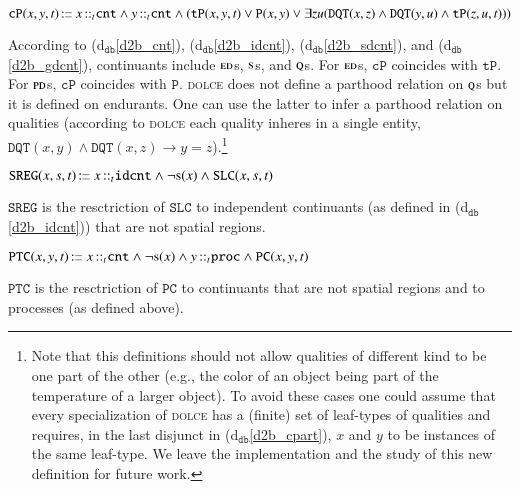 \documentclass[ao]{iosart2x}
\newcommand{\dbDefLabel}{\textrm{d$_\texttt{db}$}}
\newcounter{cntdbdf}
\newcommand{\dbdf}[1]{\refstepcounter{cntdbdf}\begin{small}{\bf \dbDefLabel\thecntdbdf\label{#1}}\end{small}}
\newcommand{\refdbdf}[1]{({\dbDefLabel}\ref{#1})}
\newcommand{\pr}[1]{\mathtt{#1}}
\newcommand{\cn}[1]{\mathtt{#1}}
\newcommand\textequal{%
 \rule[.08ex]{5pt}{0.35pt}\llap{\rule[.78ex]{5pt}{0.35pt}}}
\newcommand{\sdef}{{\hspace{1.5pt}:\hspace{-2.5pt}\textequal\hspace{3pt}}}
\newcommand{\dolce}{{\textsc{dolce}}}
\newcommand{\bfo}{{\textsc{bfo}}}
\newcommand {\EDdcat} {\textsc{ed}}
\newcommand {\PDdcat} {\textsc{pd}}
\newcommand {\Qdcat} {\textsc{q}}
\newcommand {\Sdcat} {\textsc{s}}
\newcommand {\TPd} {\ensuremath{\pr{tP}}}
\newcommand {\Pd} {\ensuremath{\pr{P}}}
\newcommand {\DQTd} {\ensuremath{\pr{DQT}}}
\newcommand {\PCd} {\ensuremath{\pr{PC}}}
\newcommand {\SLCd} {\ensuremath{\pr{SLC}}}
\newcommand{\cntbcat}{\cn{cnt}}
\newcommand{\idcntbcat}{\cn{idcnt}}
\newcommand{\procbcat}{\cn{proc}}
\newcommand{\bfocpart}{\pr{cP}}
\newcommand{\bfoiof}[1]{{\,::_{#1\:\!}}}
\newcommand{\bfosregof}{\pr{SREG}}
\newcommand{\bfoparticin}{\pr{PTC}}
\begin{document}
\item[\dbdf{d2b_cpart}] $\bfocpart(x,y,t) \sdef x \bfoiof{t} \cntbcat \land y \bfoiof{t} \cntbcat \land (\TPd(x,y,t) \lor \Pd(x,y) \lor \exists zu(\DQTd(x,z) \land \DQTd(y,u) \land \TPd(z,u,t)))$

\vspace{1pt}
According to \refdbdf{d2b_cnt}, \refdbdf{d2b_idcnt}, \refdbdf{d2b_sdcnt}, and \refdbdf{d2b_gdcnt}, continuants include $\EDdcat$s, $\Sdcat$s, and $\Qdcat$s. For $\EDdcat$s, $\bfocpart$ coincides with $\TPd$. For $\PDdcat$s, $\bfocpart$ coincides with $\Pd$. {\dolce} does not define a parthood relation on $\Qdcat$s but it is defined on endurants. One can use the latter to infer a parthood relation on qualities (according to {\dolce} each quality inheres in a single entity,  $\DQTd(x,y) \land \DQTd(x,z) \to y=z$).\footnote{Note that this definitions should not allow qualities of different kind to be one part of the other (e.g., the color of an object being part of the temperature of a larger object). To avoid these cases one could assume that every specialization of {\dolce} has a (finite) set of leaf-types of qualities and requires, in the last disjunct in \refdbdf{d2b_cpart}, $x$ and $y$ to be instances of the same leaf-type. We leave the  implementation and the study of this new definition for future work.}


\item[\dbdf{d2b_sregof}] $\bfosregof(x,s,t) \sdef x \bfoiof{t} \idcntbcat \land \neg\Sdcat(x) \land \SLCd(x,s,t)$

\vspace{1pt}
$\bfosregof$ is the resctriction of $\SLCd$ to independent continuants (as defined in \refdbdf{d2b_idcnt}) that are not spatial regions.  

\item[\dbdf{d2b_partic}] $\bfoparticin(x,y,t) \sdef x \bfoiof{t} \cntbcat \land \neg\Sdcat(x) \land y \bfoiof{t} \procbcat \land \PCd(x,y,t)$

\vspace{1pt}
$\bfoparticin$ is the resctriction of $\PCd$ to continuants that are not spatial regions and to processes (as defined above).  
\end{document}
